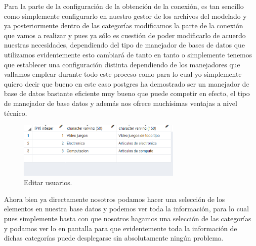 \documentclass[10pt,a4paper]{article}
\begin{document}
Para la parte de la configuración de la obtención de la conexión, es tan sencillo como simplemente configurarlo en nuestro gestor de los archivos del modelado y ya posteriormente dentro de las categorías modificamos la parte de la conexión que vamos a realizar y pues ya sólo es cuestión de poder modificarlo de acuerdo nuestras necesidades, dependiendo del tipo de manejador de bases de datos que utilizamos evidentemente esto cambiará de tanto en tanto o simplemente tenemos que establecer una configuración distinta dependiendo de los manejadores que vallamos emplear durante todo este proceso como para lo cual yo simplemente quiero decir que bueno en este caso postgres ha demostrado ser un manejador de base de datos bastante eficiente muy bueno que puede competir en efecto, el tipo de manejador de base datos y además nos ofrece muchísimas ventajas a nivel técnico.
\begin{figure}[h]
\centering
\includegraphics[width=8cm]{5XX}
\caption{Editar usuarios.}
\label{fig:re1}
\end{figure}

Ahora bien ya directamente nosotros podamos hacer una selección de los elementos en nuestra base datos y podemos ver toda la información, para lo cual pues simplemente basta con que nosotros hagamos una selección de las categorías y podamos ver lo en pantalla para que evidentemente toda la información de dichas categorías puede desplegarse sin absolutamente ningún problema.
\vspace{160mm}

\pagebreak



\end{document}
